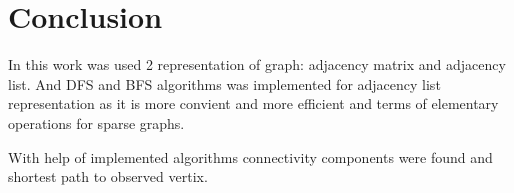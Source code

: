 \section*{Conclusion}

In this work was used 2 representation of graph: adjacency matrix and adjacency list. And DFS and BFS algorithms was implemented
for adjacency list representation as it is more convient and more efficient and terms of elementary operations for sparse graphs.

With help of implemented algorithms connectivity components were found and shortest path to observed vertix. 
